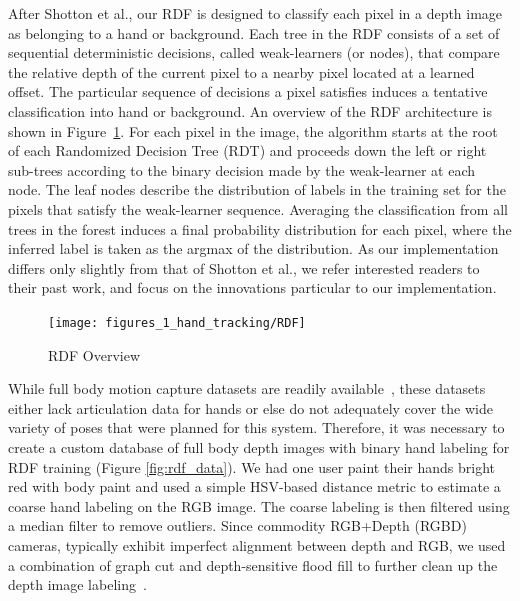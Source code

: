 After Shotton et al., our RDF is designed to classify each pixel in a depth image as belonging to a hand or background. Each tree in the RDF consists of a set of sequential deterministic decisions, called weak-learners (or nodes), that compare the relative depth of the current pixel to a nearby pixel located at a learned offset. The particular sequence of decisions a pixel satisfies induces a tentative classification into hand or background. An overview of the RDF architecture is shown in Figure~\ref{fig:rdf_overview}. For each pixel in the image, the algorithm starts at the root of each Randomized Decision Tree (RDT) and proceeds down the left or right sub-trees according to the binary decision made by the weak-learner at each node.  The leaf nodes describe the distribution of labels in the training set for the pixels that satisfy the weak-learner sequence. Averaging the classification from all trees in the forest induces a final probability distribution for each pixel, where the inferred label is taken as the argmax of the distribution. As our implementation differs only slightly from that of Shotton et al., we refer interested readers to their past work, and focus on the innovations particular to our implementation.

\begin{figure}[ht]
\centering
\texttt{[image: figures\_1\_hand\_tracking/RDF]}
    \caption{RDF Overview}
    \label{fig:rdf_overview}
\end{figure}

While full body motion capture datasets are readily available~\cite{Allen2003}, these datasets either lack articulation data for hands or else do not adequately cover the wide variety of poses that were planned for this system. Therefore, it was necessary to create a custom database of full body depth images with binary hand labeling for RDF training (Figure \ref{fig:rdf_data}). We had one user paint their hands bright red with body paint and used a simple HSV-based distance metric to estimate a coarse hand labeling on the RGB image. The coarse labeling is then filtered using a median filter to remove outliers. Since commodity RGB+Depth (RGBD) cameras, typically exhibit imperfect alignment between depth and RGB, we used a combination of graph cut and depth-sensitive flood fill to further clean up the depth image labeling~\cite{Boykov}.

